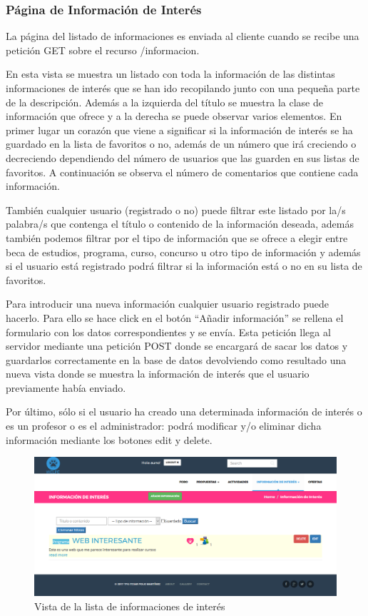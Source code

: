 \subsubsection{Página de Información de Interés}
\label{subsubsec:informaciones}


La página del listado de informaciones es enviada al cliente cuando se recibe una petición GET sobre el recurso /informacion.


En esta vista se muestra un listado con toda la información de las distintas informaciones de interés que se han ido recopilando junto con una pequeña parte de la descripción. Además a la izquierda del título se muestra la clase de información que ofrece y a la derecha se puede observar varios elementos. En primer lugar un corazón que viene a significar si la información de interés se ha guardado en la lista de favoritos o no, además de un número que irá creciendo o decreciendo dependiendo del número de usuarios que las guarden en sus listas de favoritos. A continuación se observa el número de comentarios que contiene cada información.


También cualquier usuario (registrado o no) puede filtrar este listado por la/s palabra/s que contenga el título o contenido de la información deseada, además también podemos filtrar por el tipo de información que se ofrece a elegir entre beca de estudios, programa, curso, concurso u otro tipo de información y además si el usuario está registrado podrá filtrar si la información está o no en su lista de favoritos.


Para introducir una nueva información cualquier usuario registrado puede hacerlo. Para ello se hace click en el botón “Añadir información” se rellena el formulario con los datos correspondientes y se envía. Esta petición llega al servidor mediante una petición POST donde se encargará de sacar los datos y guardarlos correctamente en la base de datos devolviendo como resultado una nueva vista donde se muestra la información de interés que el usuario previamente había enviado.


Por último, sólo si el usuario ha creado una determinada información de interés o es un profesor o es el administrador: podrá modificar y/o eliminar dicha información mediante los botones edit y delete.

\begin{figure}[H]
   \centering
   \includegraphics[width=12cm]{img/infos_interes}
   \caption{Vista de la lista de informaciones de interés}
   \label{figura:infos_interes}
\end{figure}



